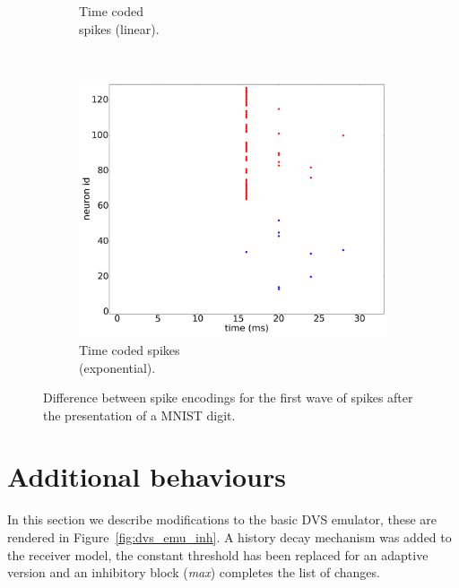 \documentclass[conference]{IEEEtran}
\begin{document}
\begin{figure}[hbt]
\begin{subfigure}[b]{0.32\textwidth}
    \caption{Time coded\\spikes (linear).}
    \label{fig:time_spikes}
  \end{subfigure}~
  \begin{subfigure}[b]{0.32\textwidth}
    \includegraphics[width=\textwidth]{time_exp_coded_-8x8-_cycle_0}
    \caption{Time coded spikes \\(exponential).}
    \label{fig:time_exp_spikes}
  \end{subfigure}
  
  \caption{Difference between spike encodings for the first wave of spikes after the presentation of a MNIST digit.}
  \label{fig:spike_codes}
\end{figure}

\section{Additional behaviours}
\label{sec:additional-behaviours}
In this section we describe modifications to the basic DVS emulator, these are rendered in Figure~\ref{fig:dvs_emu_inh}. A history decay mechanism was added to the receiver model, the constant threshold has been replaced for an adaptive version and an inhibitory block (\textit{\textsf{max}}) completes the list of changes.
\end{document}
